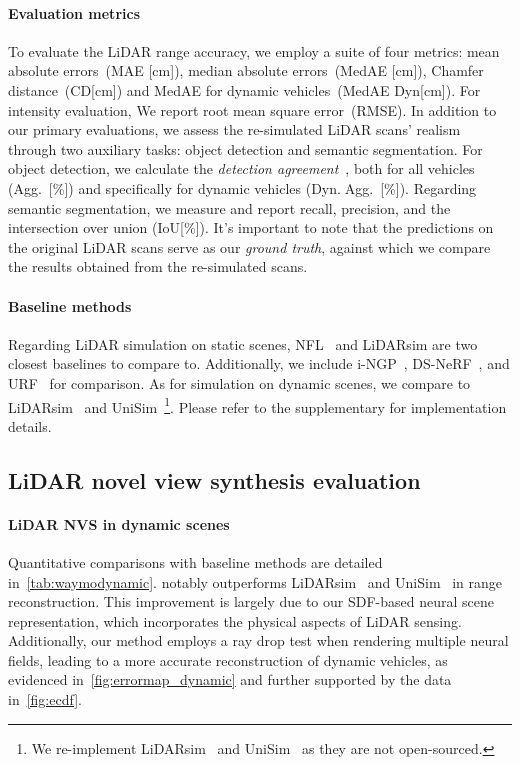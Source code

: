 \paragraph{Evaluation metrics}\label{sec:metrics}
To evaluate the LiDAR range accuracy, we employ a suite of four metrics: mean absolute errors~(MAE [cm]), median absolute errors~(MedAE [cm]), Chamfer distance~(CD[cm]) and MedAE for dynamic vehicles~(MedAE Dyn[cm]). For intensity evaluation, We report root mean square error~(RMSE).
%
In addition to our primary evaluations, we assess the re-simulated LiDAR scans' realism through two auxiliary tasks: object detection and semantic segmentation. For object detection, we calculate the \textit{detection agreement}~\cite{manivasagam2020lidarsim}, both for all vehicles (Agg.~[\%]) and specifically for dynamic vehicles (Dyn.$\;$Agg.~[\%]). Regarding semantic segmentation, we measure and report recall, precision, and the intersection over union (IoU[\%]). It's important to note that the predictions on the original LiDAR scans serve as our \textit{ground truth}, against which we compare the results obtained from the re-simulated scans.




\paragraph{Baseline methods}
Regarding LiDAR simulation on static scenes, NFL~\cite{Huang2023nfl} and LiDARsim\cite{manivasagam2020lidarsim} are two closest baselines to compare to. Additionally, we include i-NGP~\cite{mueller2022instant}, DS-NeRF~\cite{kangle2021dsnerf}, and URF~\cite{rematas2022urban} for comparison. As for simulation on dynamic scenes, we compare to LiDARsim~\cite{manivasagam2020lidarsim} and UniSim~\cite{yang2023unisim}\footnote{We re-implement LiDARsim~\cite{lee2015lidar} and UniSim~\cite{yang2023unisim} as they are not open-sourced.}. Please refer to the supplementary for implementation details.






\subsection{LiDAR novel view synthesis evaluation} \label{sec:lidar_eval}
\paragraph{LiDAR NVS in dynamic scenes}
Quantitative comparisons with baseline methods are detailed in~\cref{tab:waymodynamic}. \dynfl notably outperforms LiDARsim~\cite{manivasagam2020lidarsim} and UniSim~\cite{yang2023unisim} in range reconstruction. This improvement is largely due to our SDF-based neural scene representation, which incorporates the physical aspects of LiDAR sensing. Additionally, our method employs a ray drop test when rendering multiple neural fields, leading to a more accurate reconstruction of dynamic vehicles, as evidenced in~\cref{fig:errormap_dynamic} and further supported by the data in~\cref{fig:ecdf}.


